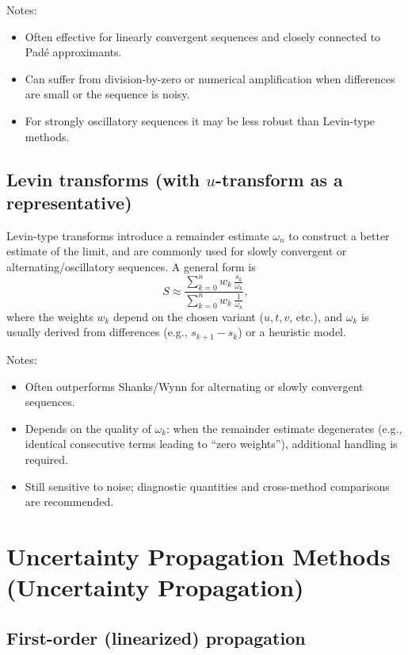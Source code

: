 \documentclass[a4paper,11pt]{article}
\begin{document}
Notes:
\begin{itemize}
  \item Often effective for linearly convergent sequences and closely connected to Pad\'e approximants.
  \item Can suffer from division-by-zero or numerical amplification when differences are small or the sequence is noisy.
  \item For strongly oscillatory sequences it may be less robust than Levin-type methods.
\end{itemize}

\subsection{Levin transforms (with $u$-transform as a representative)}

Levin-type transforms introduce a remainder estimate $\omega_n$ to construct a better estimate of the limit, and are commonly used for slowly convergent or alternating/oscillatory sequences. A general form is
\begin{equation}
S \approx \frac{\sum_{k=0}^{n} w_k\,\frac{s_k}{\omega_k}}{\sum_{k=0}^{n} w_k\,\frac{1}{\omega_k}},
\end{equation}
where the weights $w_k$ depend on the chosen variant ($u,t,v$, etc.), and $\omega_k$ is usually derived from differences (e.g., $s_{k+1}-s_k$) or a heuristic model.

Notes:
\begin{itemize}
  \item Often outperforms Shanks/Wynn for alternating or slowly convergent sequences.
  \item Depends on the quality of $\omega_k$: when the remainder estimate degenerates (e.g., identical consecutive terms leading to ``zero weights''), additional handling is required.
  \item Still sensitive to noise; diagnostic quantities and cross-method comparisons are recommended.
\end{itemize}

\section{Uncertainty Propagation Methods (Uncertainty Propagation)}

\subsection{First-order (linearized) propagation}
\end{document}
